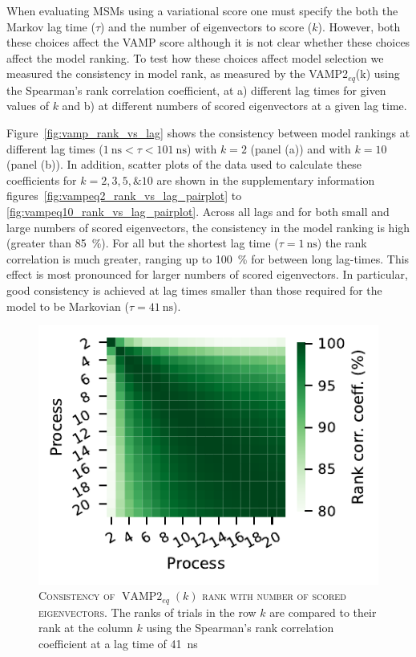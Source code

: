 \documentclass[journal=jacsat,manuscript=article]{achemso}
\begin{document}
When evaluating MSMs using a variational score one must specify the both the Markov lag time ($\tau$) and the number of eigenvectors to score ($k$).  However, both these choices affect the VAMP score although it is not clear  whether these choices affect the model ranking.  To test how these choices affect model selection we measured the consistency in model rank, as measured by the VAMP2$_{eq}$(k) using the Spearman's rank correlation coefficient, at a) different lag times for given values of $k$ and b) at different numbers of scored eigenvectors at a given lag time. 

Figure~\ref{fig:vamp_rank_vs_lag} shows the consistency between model rankings at different lag times ($\SI{1}{\nano\second} < \tau < \SI{101}{\nano\second}$) with $k=2$ (panel (a)) and with $k=10$ (panel (b)). In addition, scatter plots of the data used to calculate these coefficients for $k=2, 3, 5, \& 10$ are shown in the supplementary information figures~\ref{fig:vampeq2_rank_vs_lag_pairplot} to \ref{fig:vampeq10_rank_vs_lag_pairplot}.  Across all lags and for both small and large numbers of scored eigenvectors, the consistency in the model ranking is high (greater than \SI{85}{\percent}). For all but the shortest lag time ($\tau=\SI{1}{\nano\second}$) the rank correlation is much greater, ranging up to \SI{100}{\percent} for between long lag-times.  This effect is most pronounced for larger numbers of scored eigenvectors. In particular, good consistency is achieved at lag times smaller than those required for the model to be Markovian ($\tau=\SI{41}{\nano\second}$).


\begin{figure}
    \centering
    \includegraphics{figures/vampeq_rank_vs_proc.pdf}
    \caption{\textsc{Consistency of $\operatorname{VAMP2}_{eq}(k)$ rank with number of scored eigenvectors}. The ranks of trials in the row $k$ are compared to their rank at the column $k$ using the Spearman's rank correlation coefficient at a lag time of \SI{41}{\nano\second}}
    \label{fig:vampeq_rank_vs_n_procs}
\end{figure}
\end{document}
